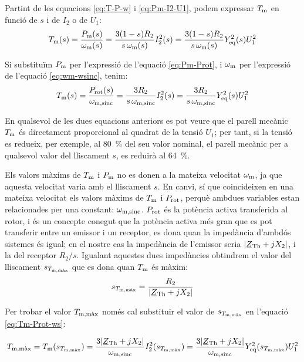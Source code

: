 Partint de les equacions \eqref{eq:T-P-w} i \eqref{eq:Pm-I2-U1}, podem expressar  $T_\mathrm{m}$ en funció de $s$ i de $I_2$ o de $U_1$:
\begin{equation}
    T_\mathrm{m}(s)  =  \frac{P_\mathrm{m}(s)}{\omega_\mathrm{m}(s)} =  \frac{3(1-s) R_2}{s\,\omega_\mathrm{m}(s)} I_2^2(s) =
     \frac{3(1-s) R_2}{s\,\omega_\mathrm{m}(s)} Y_\mathrm{eq}^2(s) U_1^2
\end{equation}

Si substituïm $P_\mathrm{m}$ per l'expressió de l'equació \eqref{eq:Pm-Prot}, i $\omega_\mathrm{m}$ per l'expressió de l'equació \eqref{eq:wm-wsinc}, tenim:
\begin{equation}\index{motors d'inducció!parell mecànic}
    T\ped{m}(s)  =  \frac{P\ped{rot}(s)}{\omega\ped{m,sinc}} =   \frac{3 R_2}{s\,\omega\ped{m,sinc}} I_2^2(s) =
     \frac{3 R_2}{s\,\omega\ped{m,sinc}} Y\ped{eq}^2(s) U_1^2 \label{eq:Tm-Prot-ws}
\end{equation}

En qualsevol de les dues equacions anteriors es pot veure que el parell mecànic $T_\mathrm{m}$ és directament proporcional al quadrat de la tensió $U_1$; per tant, si la tensió es redueix, per exemple, al \qty{80}{\%} del seu valor nominal, el parell mecànic per a qualsevol valor del lliscament $s$,  es reduirà al \qty{64}{\%}.

Els valors màxims de $T_\mathrm{m}$ i $P_\mathrm{m}$ no es donen a la mateixa velocitat  $\omega_\mathrm{m}$, ja que aquesta velocitat varia amb el lliscament $s$. En canvi, sí que coincideixen en una mateixa velocitat els valors  màxims de $T_\mathrm{m}$ i $P_\mathrm{rot}$, perquè ambdues variables estan relacionades per una constant: $\omega_\mathrm{m,sinc}$. $P_\mathrm{rot}$ és la potència activa transferida al rotor, i és un concepte conegut que la potència activa més gran que es pot transferir entre un emissor i un receptor, es dona quan la impedància d'ambdós sistemes és igual; en el nostre cas la impedància de l'emissor seria $|\cmplx{Z}\ped{Th} + j X_2|$, i la del receptor $R_2/s$. Igualant aquestes dues impedàncies obtindrem el valor del lliscament $s_{T_\mathrm{m,\text{màx}}}$ que es dona quan $T_\mathrm{m}$ és màxim:
\begin{equation}
    s_{T\ped{m,\text{màx}}} =  \frac{R_2}{|\cmplx{Z}\ped{Th} + j X_2|} \label{eq:s-T-max}
\end{equation}

Per trobar el valor  $T_\mathrm{m,\text{màx}}$ només cal substituir el valor de $s_{T_\mathrm{m,\text{màx}}}$ en l'equació \eqref{eq:Tm-Prot-ws}:

\begin{equation}
    T\ped{m,\text{màx}}  =  T\ped{m}(s_{T\ped{m,\text{màx}}}) =  \frac{3 |\cmplx{Z}\ped{Th} + j X_2|}{\omega\ped{m,sinc}} I_2^2(s_{T\ped{m,\text{màx}}}) = \frac{3 |\cmplx{Z}\ped{Th} + j X_2|}{\omega\ped{m,sinc}} Y\ped{eq}^2(s_{T\ped{m,\text{màx}}}) U_1^2
\end{equation}


